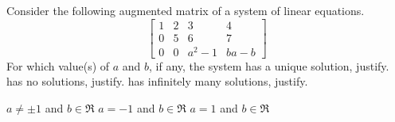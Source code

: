 
\begin{Exercise}[name={},
title={}, 
origin={\cite{YL}},
counter=Exercise]
Consider the following augmented matrix of a system of linear equations.
\[
\begin{bmatrix}
1 & 2 & 3 & 4\\
0 & 5 & 6 & 7\\
0 & 0 & a^2-1 & ba-b
\end{bmatrix}
\]
For which value(s) of $a$ and $b$, if any, the system
\Question has a unique solution, justify.
\Question has no solutions, justify.
\Question has infinitely many solutions, justify.
\end{Exercise}

\begin{Answer}
\Question $a\neq\pm 1$ and $b\in\Re$
\Question $a=-1$ and $b\in\Re$
\Question $a=1$ and $b\in\Re$
\end{Answer}

